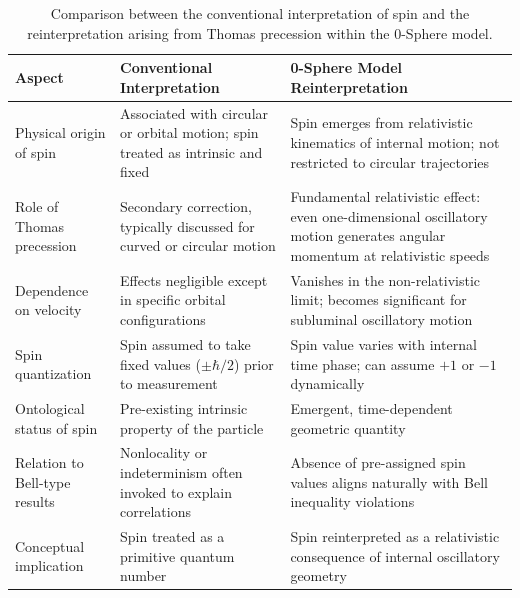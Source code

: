 \documentclass[12pt,letterpaper]{article}
\begin{document}
\begin{table}[h!]
\centering
\renewcommand{\arraystretch}{1.3}
\begin{tabularx}{\textwidth}{l X X}
\toprule
\textbf{Aspect} 
& \textbf{Conventional Interpretation} 
& \textbf{0-Sphere Model Reinterpretation} \\
\midrule
Physical origin of spin 
& Associated with circular or orbital motion; spin treated as intrinsic and fixed 
& Spin emerges from relativistic kinematics of internal motion; not restricted to circular trajectories \\

Role of Thomas precession 
& Secondary correction, typically discussed for curved or circular motion 
& Fundamental relativistic effect: even one-dimensional oscillatory motion generates angular momentum at relativistic speeds \\

Dependence on velocity 
& Effects negligible except in specific orbital configurations 
& Vanishes in the non-relativistic limit; becomes significant for subluminal oscillatory motion \\

Spin quantization 
& Spin assumed to take fixed values ($\pm \hbar/2$) prior to measurement 
& Spin value varies with internal time phase; can assume $+1$ or $-1$ dynamically \\

Ontological status of spin 
& Pre-existing intrinsic property of the particle 
& Emergent, time-dependent geometric quantity \\

Relation to Bell-type results 
& Nonlocality or indeterminism often invoked to explain correlations 
& Absence of pre-assigned spin values aligns naturally with Bell inequality violations \\

Conceptual implication 
& Spin treated as a primitive quantum number 
& Spin reinterpreted as a relativistic consequence of internal oscillatory geometry \\
\bottomrule
\end{tabularx}
\caption{Comparison between the conventional interpretation of spin and the reinterpretation arising from Thomas precession within the 0-Sphere model.}
\label{tab:spin_thomas_comparison}
\end{table}
\end{document}
